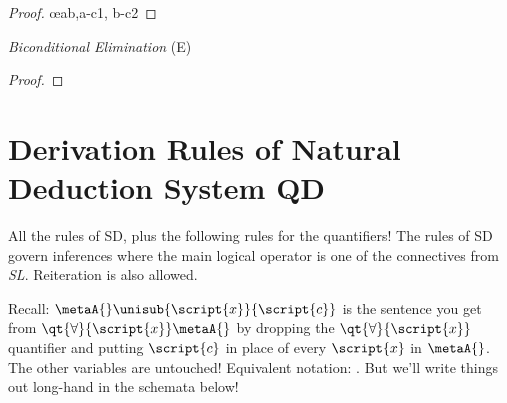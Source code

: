 \begin{multicols}{2}
\begin{proof}
	\open
		 
	\close
\breakline
	\open
		 
	\close
	 \oe{ab,a-c1, b-c2}
\end{proof}




\textit{Biconditional Elimination} (\eiff E) \vspace{-1em}

\begin{proof}
	 
\end{proof}

\end{multicols} %


\section*{\hfill \normalsize \bf Derivation Rules of Natural Deduction System QD \hfill} 
\label{nd-proofrules}
				
				\vspace{-1em}
				
All the rules of SD, plus the following rules for the quantifiers! The rules of SD govern inferences where the main logical operator is one of the connectives from {\it{SL}}. Reiteration is also allowed.


Recall: $\metaA{}\unisub{\script{x}}{\script{c}}$ is the sentence you get from $\qt{\forall}{\script{x}}\metaA{}$ by dropping the $\qt{\forall}{\script{x}}$ quantifier and putting $\script{c}$ in place of every $\script{x}$ in $\metaA{}$. The other variables are untouched! Equivalent notation: \metaA{}\hspace{.15em}. But we'll write things out long-hand in the schemata below! 




